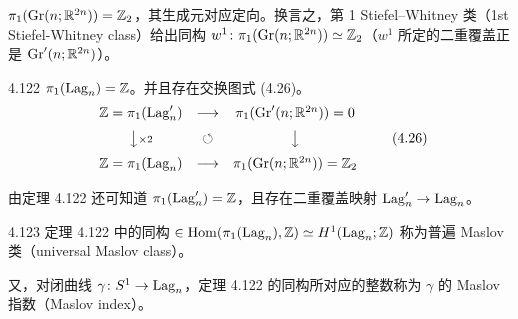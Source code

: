 $\pi_1(\operatorname{Gr}(n;\mathbb{R}^{2n}))=\mathbb{Z}_2$，其生成元对应定向。换言之，第 1 Stiefel–Whitney 类（1st Stiefel-Whitney class）给出同构 $w^1\colon\pi_1(\operatorname{Gr}(n;\mathbb{R}^{2n}))\simeq\mathbb{Z}_2$（$w^1$ 所定的二重覆盖正是 $\operatorname{Gr}'(n;\mathbb{R}^{2n})$）。

\begin{theorem}{4.122}
  $\pi_1(\operatorname{Lag}_n)=\mathbb{Z}$。并且存在交换图式 (4.26)。
  \begin{equation}
    \begin{array}{ccc}
      \mathbb{Z}=\pi_1(\operatorname{Lag}'_n) & \longrightarrow & \pi_1(\operatorname{Gr}'(n;\mathbb{R}^{2n}))=0 \\[6pt]
      \big\downarrow{\scriptstyle\times 2} & \circlearrowleft & \big\downarrow \\[6pt]
      \mathbb{Z}=\pi_1(\operatorname{Lag}_n) & \longrightarrow & \pi_1(\operatorname{Gr}(n;\mathbb{R}^{2n}))=\mathbb{Z}_2
    \end{array}
    \tag{4.26}
  \end{equation}
\end{theorem}

由定理 4.122 还可知道 $\pi_1(\operatorname{Lag}'_n)=\mathbb{Z}$，且存在二重覆盖映射 $\operatorname{Lag}'_n\to\operatorname{Lag}_n$。

\begin{definition}{4.123}
  定理 4.122 中的同构 $\in\operatorname{Hom}(\pi_1(\operatorname{Lag}_n),\mathbb{Z})\simeq H^1(\operatorname{Lag}_n;\mathbb{Z})$ 称为普遍 Maslov 类（universal Maslov class）。

  又，对闭曲线 $\gamma\colon S^1\to\operatorname{Lag}_n$，定理 4.122 的同构所对应的整数称为 $\gamma$ 的 Maslov 指数（Maslov index）。
\end{definition}


